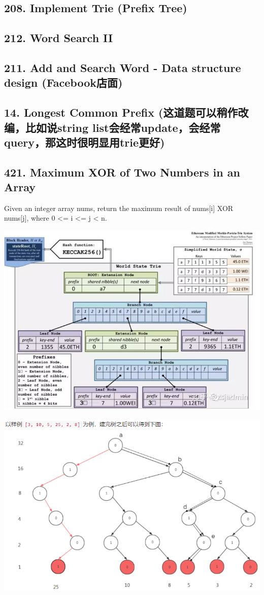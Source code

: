 \documentclass[9pt, b5paper]{article}
\begin{document}
\subsection{208. Implement Trie (Prefix Tree)}
\label{sec-13-1}
\subsection{212. Word Search II}
\label{sec-13-2}
\subsection{211. Add and Search Word - Data structure design (Facebook店面)}
\label{sec-13-3}
\subsection{14. Longest Common Prefix (这道题可以稍作改编，比如说string list会经常update，会经常query，那这时很明显用trie更好)}
\label{sec-13-4}
\subsection{421. Maximum XOR of Two Numbers in an Array}
\label{sec-13-5}
Given an integer array nums, return the maximum result of nums[i] XOR nums[j], where 0 <= i <= j < n.

\includegraphics[width=.9\linewidth]{./pic/numTrie.png}

\includegraphics[width=.9\linewidth]{./pic/numTrie2.png}
\end{document}
